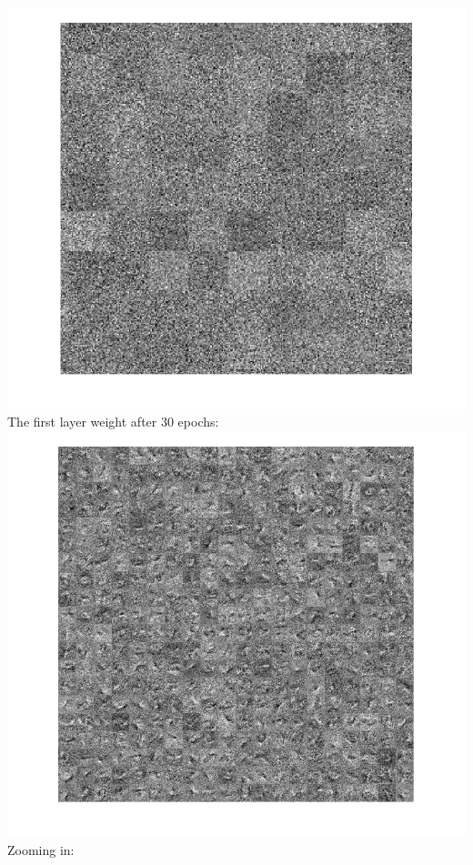 \documentclass[12pt,letterpaper,boxed]{hmcpset}
\begin{document}
\begin{solution}
\includegraphics[width=\textwidth]{3_1_3_211.png}\\
\newpage
The first layer weight after 30 epochs:\\
\includegraphics[width=\textwidth]{3_1_3_21.png}\\
Zooming in:\\

\end{solution}
\end{document}
